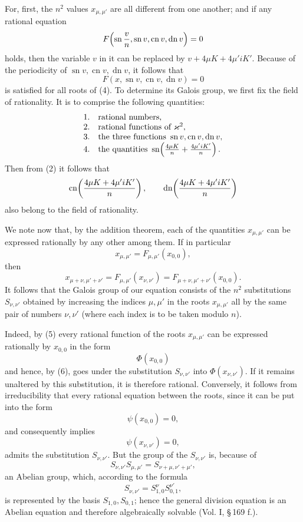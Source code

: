 \documentclass[11pt]{article}
\providecommand{\sn}{\operatorname{sn}}
\providecommand{\cn}{\operatorname{cn}}
\providecommand{\dn}{\operatorname{dn}}
\begin{document}
For, first, the $n^2$ values $x_{\mu,\mu'}$ are all different from one another; and if any
rational equation
\[
F\!\left(\sn {v\over n},\sn v,\cn v,\dn v\right)=0
\]
holds, then the variable $v$ in it can be replaced by $v+4\mu K+4\mu'iK'$. Because of the
periodicity of $\sn v,\cn v,\dn v$, it follows that
\[
F(x,\sn v,\cn v,\dn v)=0
\]
is satisfied for all roots of (4). To determine its Galois group, we first fix the field of
rationality. It is to comprise the following quantities:
\[
\begin{array}{ll}
1.& \text{rational numbers,}\\
2.& \text{rational functions of }\varkappa^2,\\
3.& \text{the three functions }\sn v,\cn v,\dn v,\\
4.& \text{the quantities }\sn\!\left({4\mu K\over n}+{4\mu'iK'\over n}\right).
\end{array}
\]
Then from (2) it follows that
\[
\cn\!\left({4\mu K+4\mu'iK'\over n}\right),\qquad
\dn\!\left({4\mu K+4\mu'iK'\over n}\right)
\]
also belong to the field of rationality.

We note now that, by the addition theorem, each of the quantities $x_{\mu,\mu'}$ can be
expressed rationally by any other among them. If in particular
\begin{equation}
x_{\mu,\mu'}=F_{\mu,\mu'}(x_{0,0}),
\tag{5}
\end{equation}
then
\begin{equation}
x_{\mu+\nu,\mu'+\nu'}=F_{\mu,\mu'}(x_{\nu,\nu'})
=F_{\mu+\nu,\mu'+\nu'}(x_{0,0}).
\tag{6}
\end{equation}
It follows that the Galois group of our equation consists of the $n^2$ substitutions
$S_{\nu,\nu'}$ obtained by increasing the indices $\mu,\mu'$ in the roots $x_{\mu,\mu'}$
all by the same pair of numbers $\nu,\nu'$ (where each index is to be taken modulo $n$).

Indeed, by (5) every rational function of the roots $x_{\mu,\mu'}$ can be expressed
rationally by $x_{0,0}$ in the form
\[
\Phi(x_{0,0})
\]
and hence, by (6), goes under the substitution $S_{\nu,\nu'}$ into $\Phi(x_{\nu,\nu'})$.
If it remains unaltered by this substitution, it is therefore rational. Conversely, it follows
from irreducibility that every rational equation between the roots, since it can be put into
the form
\[
\psi(x_{0,0})=0,
\]
and consequently implies
\[
\psi(x_{\nu,\nu'})=0,
\]
admits the substitution $S_{\nu,\nu'}$. But the group of the $S_{\nu,\nu'}$ is, because of
\[
S_{\nu,\nu'}S_{\mu,\mu'}=S_{\nu+\mu,\nu'+\mu'},
\]
an Abelian group, which, according to the formula
\[
S_{\nu,\nu'}=S_{1,0}^{\nu}S_{0,1}^{\nu'},
\]
is represented by the basis $S_{1,0},S_{0,1}$; hence the general division equation is an
Abelian equation and therefore algebraically solvable (Vol. I, \S\,169 f.).
\end{document}
